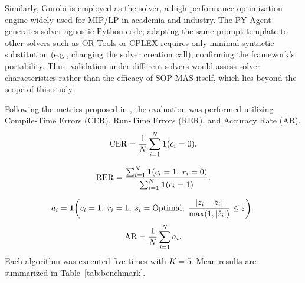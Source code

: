 \documentclass[preprint,12pt]{elsarticle}
\begin{document}
Similarly, Gurobi is employed as the solver, a high-performance optimization engine widely used for MIP/LP in academia and industry. The PY-Agent generates solver-agnostic Python code; adapting the same prompt template to other solvers such as OR-Tools or CPLEX requires only minimal syntactic substitution (e.g., changing the solver creation call), confirming the framework's portability. Thus, validation under different solvers would assess solver characteristics rather than the efficacy of SOP-MAS itself, which lies beyond the scope of this study.

Following the metrics proposed in \citet{xiaoChainofExpertsWhenLLMs2023}, the evaluation was performed utilizing Compile-Time Errors (CER), Run-Time Errors (RER), and Accuracy Rate (AR). 
\begin{equation}
\mathrm{CER}=\frac{1}{N}\sum_{i=1}^{N}\mathbf{1}(c_i=0).
\end{equation}


\begin{equation}
\mathrm{RER}=\frac{\sum_{i=1}^{N}\mathbf{1}(c_i=1,\; r_i=0)}{\sum_{i=1}^{N}\mathbf{1}(c_i=1)}.
\end{equation}

\begin{equation}
a_i=\mathbf{1}\!\left(c_i=1,\; r_i=1,\; s_i=\mathrm{Optimal},\; \frac{|z_i-\hat z_i|}{\max(1,|\hat z_i|)}\le \varepsilon\right).
\end{equation}
\begin{equation}
\mathrm{AR}=\frac{1}{N}\sum_{i=1}^{N} a_i.
\end{equation}
 Each algorithm was executed five times with $K=5$. Mean results are summarized in Table~\ref{tab:benchmark}.

\end{document}
